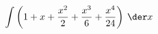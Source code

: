 $\displaystyle \int \left( 1+x+\frac{x^2}{2}+\frac{x^3}{6}+\frac{x^4}{24} \right)   \:\der x $\answercheck
